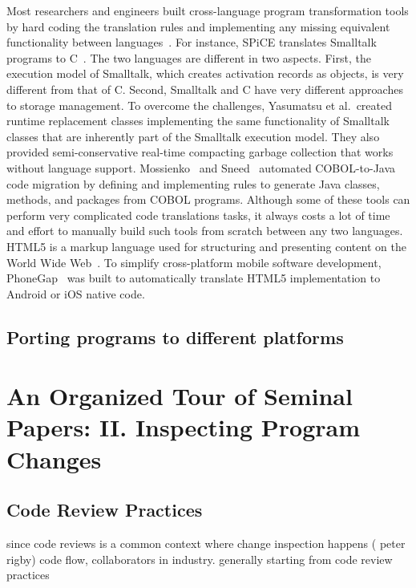\documentclass[runningheads,a4paper]{llncs}
\begin{document}
Most researchers and engineers built cross-language program transformation tools by hard coding the translation rules and implementing any missing equivalent functionality between languages~\cite{Yasumatsu:95,Mossienko:03,Sneed:2010,jovial2c,cobol2java}. For instance, SPiCE translates Smalltalk programs to C~\cite{Yasumatsu:95}. The two languages are different in two aspects. First, the execution model of Smalltalk, which creates activation records as objects, is very different from that of C. Second, Smalltalk and C have very different approaches to storage management. To overcome the challenges, Yasumatsu et al.~created runtime replacement classes implementing the same functionality of Smalltalk classes that are inherently part of the Smalltalk execution model. They also provided semi-conservative real-time compacting garbage collection that works without language support.
Mossienko~\cite{Mossienko:03} and Sneed~\cite{Sneed:2010} automated COBOL-to-Java code migration by defining and implementing rules to generate Java classes, methods, and packages from COBOL programs. Although some of these tools can perform very complicated code translations tasks, it always costs a lot of time and effort to manually build such tools from scratch between any two languages. HTML5 is a markup language used for structuring and presenting content on the World Wide Web~\cite{html5}. To simplify cross-platform mobile software development, PhoneGap~\cite{phonegap} was built to automatically translate HTML5 implementation to Android or iOS native code.

\subsection{Porting programs to different platforms} 

\section{An Organized Tour of Seminal Papers: II. Inspecting Program Changes}

\subsection{Code Review Practices}
since code reviews is a common context where change inspection happens ( peter rigby)  code flow, collaborators in industry. generally starting from code review practices
\end{document}
